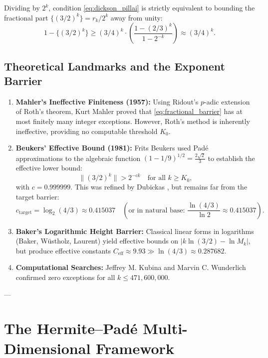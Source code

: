 \documentclass[11pt,reqno]{article}
\theoremstyle{plain}
\theoremstyle{definition}
\numberwithin{equation}{section}
\begin{document}
Dividing by $2^k$, condition \eqref{eq:dickson_pillai} is strictly equivalent to bounding the fractional part $\{(3/2)^k\} = r_k / 2^k$ away from unity:
\begin{equation}\label{eq:fractional_barrier}
1 - \{(3/2)^k\} \ge (3/4)^k \cdot \left(\frac{1 - (2/3)^k}{1 - 2^{-k}}\right) \approx (3/4)^k.
\end{equation}

\subsection{Theoretical Landmarks and the Exponent Barrier}
\begin{enumerate}
    \item \textbf{Mahler's Ineffective Finiteness (1957):} Using Ridout's $p$-adic extension of Roth's theorem, Kurt Mahler \cite{mahler1957} proved that \eqref{eq:fractional_barrier} has at most finitely many integer exceptions. However, Roth's method is inherently ineffective, providing no computable threshold $K_0$.
    \item \textbf{Beukers' Effective Bound (1981):} Frits Beukers \cite{beukers1981} used Pad\'e approximations to the algebraic function $(1 - 1/9)^{1/2} = \frac{2\sqrt{2}}{3}$ to establish the effective lower bound:
    \begin{equation}
    \|(3/2)^k\| > 2^{-c k} \quad \text{for all } k \ge K_0,
    \end{equation}
    with $c = 0.999999$. This was refined by Dubickas \cite{dubickas2006}, but remains far from the target barrier:
    \begin{equation}
    c_{\mathrm{target}} = \log_2(4/3) \approx 0.415037 \quad \left(\text{or in natural base: } \frac{\ln(4/3)}{\ln 2} \approx 0.415037\right).
    \end{equation}
    \item \textbf{Baker's Logarithmic Height Barrier:} Classical linear forms in logarithms (Baker, W\"ustholz, Laurent) yield effective bounds on $|k \ln(3/2) - \ln M_k|$, but produce effective constants $C_{\mathrm{eff}} \approx 9.93 \gg \ln(4/3) \approx 0.287682$.
    \item \textbf{Computational Searches:} Jeffrey M. Kubina and Marvin C. Wunderlich \cite{kubina1990} confirmed zero exceptions for all $k \le 471{,}600{,}000$.
\end{enumerate}

---

\section{The Hermite--Pad\'e Multi-Dimensional Framework}
\end{document}
